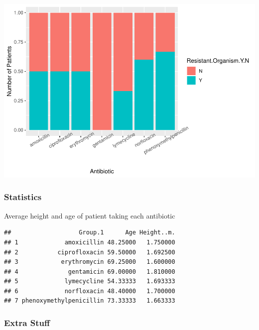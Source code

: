 \documentclass[]{article}
\newenvironment{Shaded}{\begin{snugshade}}{\end{snugshade}}
\newcommand{\DataTypeTok}[1]{\textcolor[rgb]{0.13,0.29,0.53}{#1}}
\newcommand{\DecValTok}[1]{\textcolor[rgb]{0.00,0.00,0.81}{#1}}
\newcommand{\KeywordTok}[1]{\textcolor[rgb]{0.13,0.29,0.53}{\textbf{#1}}}
\newcommand{\NormalTok}[1]{#1}
\newcommand{\OperatorTok}[1]{\textcolor[rgb]{0.81,0.36,0.00}{\textbf{#1}}}
\begin{document}
\includegraphics{IDDAP_Visuals_Stat_files/figure-latex/unnamed-chunk-3-1.pdf}

\hypertarget{statistics}{%
\subsubsection{Statistics}\label{statistics}}

Average height and age of patient taking each antibiotic

\begin{Shaded}
\end{Shaded}

\begin{verbatim}
##                   Group.1      Age Height..m.
## 1             amoxicillin 48.25000   1.750000
## 2           ciprofloxacin 59.50000   1.692500
## 3            erythromycin 69.25000   1.600000
## 4              gentamicin 69.00000   1.810000
## 5             lymecycline 54.33333   1.693333
## 6             norfloxacin 48.40000   1.700000
## 7 phenoxymethylpenicillin 73.33333   1.663333
\end{verbatim}

\hypertarget{extra-stuff}{%
\subsubsection{Extra Stuff}\label{extra-stuff}}
\end{document}
